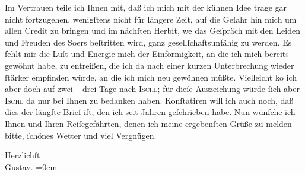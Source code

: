 \pstart
           Im Vertrauen teile ich Ihnen mit, daß ich mich mit der kühnen Idee trage {\pb}gar nicht fortzugehen, wenigſtens
               nicht für längere Zeit, auf die Geſahr hin mich um allen Credit zu bringen und im
               nächſten Herbſt, we{\geminationn} das Geſpräch mit den Leiden und
               Freuden des So{\geminationm}ers beſtritten wird, ganz
               gesellſchaftsunfähig zu werden. Es fehlt mir die Luſt und Energie mich der
               Einförmigkeit, an die ich mich bereit\textcolor{gray}{s} gewöhnt habe, zu entreißen,
               die ich da{\geminationn} nach einer kurzen Unterbrechung wieder{ }ſtärker empfinden würde, an die ich mich neu gewöhnen müßte. Vielleicht ko{\geminationm} ich aber doch auf zwei – drei Tage nach \textsc{Ischl}; für dieſe Auszeichung würde{ }ſich aber \textsc{Ischl} da{\geminationn} nur bei Ihnen zu bedanken haben. Konſtatiren
               will ich auch noch, daß dies der längſte Brief iſt, den ich seit Jahren geſchrieben
               habe. Nun wünſche ich Ihnen und Ihren Reiſegefährten, denen ich meine ergebenſten Grüße zu melden bitte,{ }ſchönes
               Wetter und viel Vergnügen.\pend
           
\pstart
           Herzlichſt{\\[\baselineskip]}\spacefill\mbox{Gustav.}\pend
           \leftskip=0em{}\endnumbering{}
\begin{anhang}
\end{anhang}\newcommand{\dateiname}{L04297}\newcommand{\titel}{Gustav Schwarzkopf an Arthur Schnitzler, 29. 7. 1899}\newcommand{\editorInnen}{Herausgegeben von Jahnke, SelmaMüller, Martin Anton}
